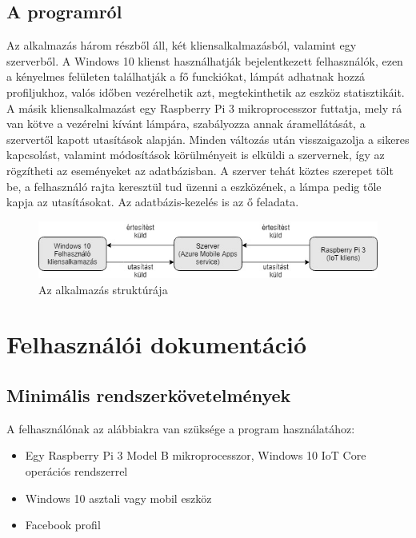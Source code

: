 \documentclass[a4paper,12pt]{report}
\begin{document}
\section{A programról}
    Az alkalmazás három részből áll, két kliensalkalmazásból, valamint egy szerverből. A Windows 10 klienst használhatják
    bejelentkezett felhasználók, ezen a kényelmes felületen találhatják a fő funckiókat, lámpát adhatnak hozzá profiljukhoz, valós időben
    vezérelhetik azt, megtekinthetik az eszköz statisztikáit. A másik kliensalkalmazást egy Raspberry Pi 3 mikroprocesszor futtatja, mely
    rá van kötve a vezérelni kívánt lámpára, szabályozza annak áramellátását, a szervertől kapott utasítások alapján. Minden változás után
    visszaigazolja a sikeres kapcsolást, valamint módosítások körülményeit is elküldi a szervernek, így az rögzítheti az eseményeket az
    adatbázisban. A szerver tehát köztes szerepet tölt be, a felhasználó rajta keresztül tud üzenni a eszközének, a lámpa pedig tőle
    kapja az utasításokat. Az adatbázis-kezelés is az ő feladata.

\begin{figure}[h!]
    \includegraphics[width=\linewidth]{images/application_diagram.jpg}
    \caption{Az alkalmazás struktúrája}
    \label{fig: Az alkalmazás struktúrája}
\end{figure}

\chapter{Felhasználói dokumentáció}

\section{Minimális rendszerkövetelmények}
    A felhasználónak az alábbiakra van szüksége a program használatához:

    \begin{itemize}
        \item Egy Raspberry Pi 3 Model B mikroprocesszor, Windows 10 IoT Core operációs rendszerrel
        \item Windows 10 asztali vagy mobil eszköz
        \item Facebook profil
    \end{itemize}
\end{document}
